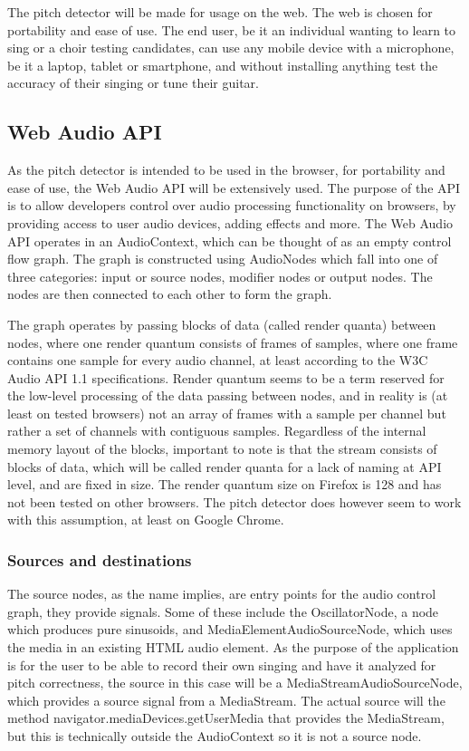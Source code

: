 The pitch detector will be made for usage on the web. The web is chosen for portability and ease of use. The end user, be it an individual wanting to learn to sing or a choir testing candidates, can use any mobile device with a microphone, be it a laptop, tablet or smartphone, and without installing anything test the accuracy of their singing or tune their guitar.

\subsection{Web Audio API}
As the pitch detector is intended to be used in the browser, for portability and ease of use, the Web Audio API will be extensively used. The purpose of the API is to allow developers control over audio processing functionality on browsers, by providing access to user audio devices, adding effects and more. 
The Web Audio API operates in an AudioContext, which can be thought of as an empty control flow graph. The graph is constructed using AudioNodes which fall into one of three categories: input or source nodes, modifier nodes or output nodes. The nodes are then connected to each other to form the graph. 

The graph operates by passing blocks of data (called render quanta) between nodes, where one render quantum consists of frames of samples, where one frame contains one sample for every audio channel, at least according to the W3C Audio API 1.1 specifications. Render quantum seems to be a term reserved for the low-level processing of the data passing between nodes, and in reality is (at least on tested browsers) not an array of frames with a sample per channel but rather a set of channels with contiguous samples. Regardless of the internal memory layout of the blocks, important to note is that the stream consists of blocks of data, which will be called render quanta for a lack of naming at API level, and are fixed in size. The render quantum size on Firefox is 128 and has not been tested on other browsers. The pitch detector does however seem to work with this assumption, at least on Google Chrome.


\subsubsection{Sources and destinations}
The source nodes, as the name implies, are entry points for the audio control graph, they provide signals. Some of these include the OscillatorNode, a node which produces pure sinusoids, and MediaElementAudioSourceNode, which uses the media in an existing HTML audio element. As the purpose of the application is for the user to be able to record their own singing and have it analyzed for pitch correctness, the source in this case will be a MediaStreamAudioSourceNode, which provides a source signal from a MediaStream. The actual source will the method navigator.mediaDevices.getUserMedia\(\) that provides the MediaStream, but this is technically outside the AudioContext so it is not a source node.

